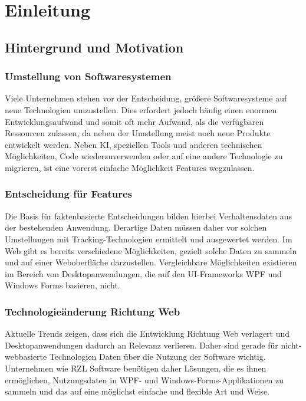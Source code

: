 \chapter{Einleitung}

\section{Hintergrund und Motivation}

\subsection{Umstellung von Softwaresystemen}
Viele Unternehmen stehen vor der Entscheidung, größere Softwaresysteme auf neue Technologien umzustellen. Dies erfordert jedoch häufig einen enormen Entwicklungsaufwand und somit oft mehr Aufwand, als die verfügbaren Ressourcen zulassen, da neben der Umstellung meist noch neue Produkte entwickelt werden. Neben KI, speziellen Tools und anderen technischen Möglichkeiten, Code wiederzuverwenden oder auf eine andere Technologie zu migrieren, ist eine vorerst einfache Möglichkeit Features wegzulassen.

\subsection{Entscheidung für Features}
Die Basis für faktenbasierte Entscheidungen bilden hierbei Verhaltensdaten aus der bestehenden Anwendung. Derartige Daten müssen daher vor solchen Umstellungen mit Tracking-Technologien ermittelt und ausgewertet werden. Im Web gibt es bereits verschiedene Möglichkeiten, gezielt solche Daten zu sammeln und auf einer Weboberfläche darzustellen. Vergleichbare Möglichkeiten existieren im Bereich von Desktopanwendungen, die auf den UI-Frameworks WPF und Windows Forms basieren, nicht.

\subsection{Technologieänderung Richtung Web}
Aktuelle Trends zeigen, dass sich die Entwicklung Richtung Web verlagert und Desktopanwendungen dadurch an Relevanz verlieren. Daher sind gerade für nicht-webbasierte Technologien Daten über die Nutzung der Software wichtig. Unternehmen wie RZL Software benötigen daher Lösungen, die es ihnen ermöglichen, Nutzungsdaten in WPF- und Windows-Forms-Applikationen zu sammeln und das auf eine möglichst einfache und flexible Art und Weise.

